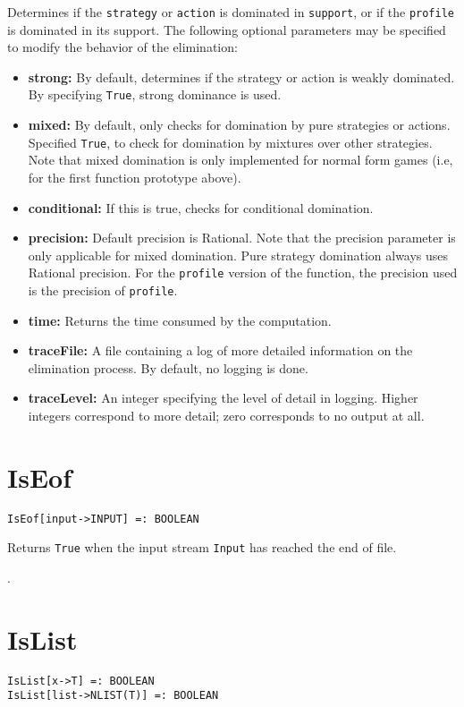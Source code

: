 \noindent
Determines if the \verb+strategy+ or \verb+action+ is dominated in
\verb+support+, or if the \verb+profile+ is dominated in its
support. The following optional parameters may be specified to modify
the behavior of the elimination:
\begin{itemize}
\item \textbf{strong:} By default, determines if the strategy or action is
weakly dominated.  By specifying \verb+True+, strong dominance is
used.
\item \textbf{mixed:} By default, only checks for domination by pure
strategies or actions.  Specified \verb+True+, to check for domination
by mixtures over other strategies.  Note that mixed domination is only
implemented for normal form games (i.e, for the first function
prototype above).
\item \textbf{conditional:} If this is true, checks for conditional domination.
\item \textbf{precision:} Default precision is Rational.  Note that the precision
parameter is only applicable for mixed domination.  Pure strategy
domination always uses Rational precision.  For the \verb+profile+ version of the 
function, the precision used is the precision of \verb+profile+.  
\item \textbf{time:} Returns the time consumed by the computation.
\item \textbf{traceFile:} A file containing a log of more detailed information
on the elimination process.  By default, no logging is done.
\item \textbf{traceLevel:} An integer specifying the level of detail in logging.
Higher integers correspond to more detail; zero corresponds to no output
at all.
\end{itemize}


\section*{IsEof}\label{PrimIsEof}
\begin{verbatim}
IsEof[input->INPUT] =: BOOLEAN
\end{verbatim}

\noindent
Returns \verb+True+ when the input stream \verb+Input+ has reached the
end of file.

\seealso {}.


\section*{IsList}\label{PrimIsList}
\begin{verbatim}
IsList[x->T] =: BOOLEAN 
IsList[list->NLIST(T)] =: BOOLEAN 
\end{verbatim}
\foralltypes

